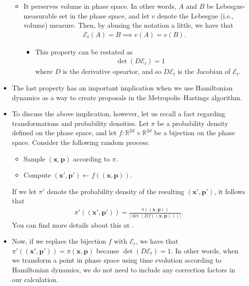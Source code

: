 \documentclass[10pt]{article}
\newcommand{\ve}[1]{\mathbf{#1}}
\newcommand{\mcal}[1]{\mathcal{#1}}
\newcommand{\Real}{\mathbb{R}}
\begin{document}
\begin{itemize}
\begin{itemize}
    \item It perserves volume in phase space. In other words, $A$ and $B$ be Lebesgue-measurable set in the phase space, and let $v$ denote the Lebesgue (i.e., volume) measure. Then, by abusing the notation a little, we have that
    \begin{align*}
      \mcal{E}_t(A) = B \implies v(A) = v(B).
    \end{align*}
    \begin{itemize}
      \item This property can be restated as
      \begin{align*}
        \det(D\mcal{E}_t) = 1
      \end{align*}
      where $D$ is the derivative opeartor, and so $D\mcal{E}_t$ is the Jacobian of $\mcal{E}_t$.
    \end{itemize}
  \end{itemize}

  \item The last property has an important implication when we use Hamiltonian dynamics as a way to create proposals in the Metropolis--Hastings algorithm.

  \item To discuss the above implication, however, let us recall a fact regarding transformations and probability densities. Let $\pi$ be a probability density defined on the phase space, and let $f: \Real^{2d} \times \Real^{2d}$ be a bijection on the phase space. Consider the following random process:
  \begin{itemize}
    \item Sample $(\ve{x},\ve{p})$ according to $\pi$.
    \item Compute $(\ve{x}',\ve{p}') \gets f((\ve{x},\ve{p})).$
  \end{itemize}
  If we let $\pi'$ denote the probability density of the resulting $(\ve{x}',\ve{p}')$, it follows that
  \begin{align*}
    \pi'((\ve{x}', \ve{p}')) = \frac{\pi((\ve{x},\ve{p}))}{|\det(Df((\ve{x},\ve{p})))|}.
  \end{align*}
  You can find more details about this at \cite{Khungurn:2022a}.

  \item Now, if we replace the bijection $f$ with $\mcal{E}_t$, we have that $\pi'((\ve{x}',\ve{p}')) = \pi(\ve{x},\ve{p})$ because $\det(D\mcal{E}_t) = 1$. In other words, when we transform a point in phase space using time evolution according to Hamiltonian dynamics, we do not need to include any correction factors in our calculation.
\end{itemize}
\end{document}
